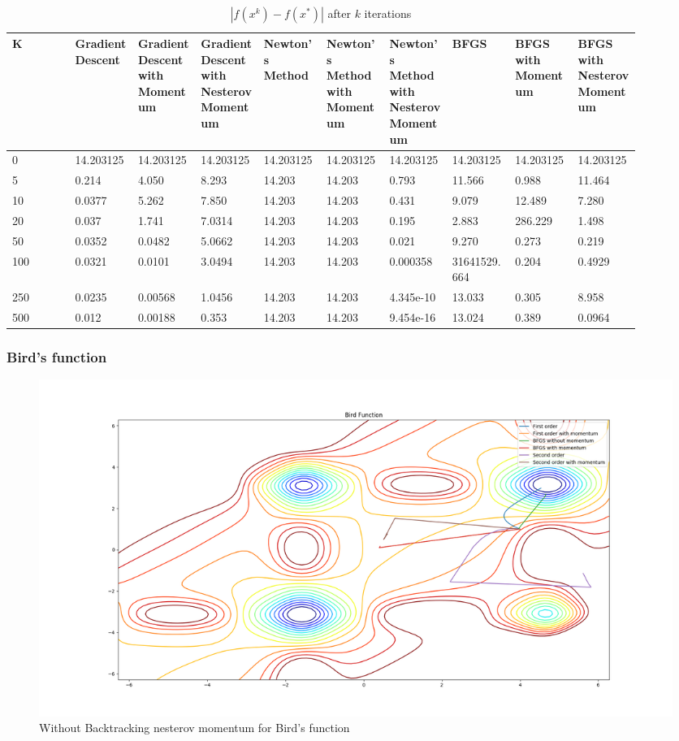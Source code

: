 \documentclass{article}
\begin{document}
\begin{table}[H]
	\centering
	\caption{$ | f(x^k) - f(x^*) | $ after $k$ iterations}
	\label{Beale's function table}
	\begin{tabular}{|l|p{0.1\linewidth}|p{0.1\linewidth}|p{0.1\linewidth}|p{0.1\linewidth}|p{0.1\linewidth}|p{0.1\linewidth}|p{0.1\linewidth}|p{0.1\linewidth}|p{0.1\linewidth}|}
		\hline
		K & Gradient Descent & Gradient Descent with Momentum & Gradient Descent with Nesterov Momentum & Newton's Method & Newton's Method with Momentum & Newton's Method with Nesterov Momentum & BFGS & BFGS with Momentum & BFGS with Nesterov Momentum \\
		\hline
		0 & 14.203125 & 14.203125 & 14.203125 & 14.203125 & 14.203125 & 14.203125 & 14.203125 & 14.203125 & 14.203125 \\
		\hline
		5 & 0.214 & 4.050 & 8.293 & 14.203 & 14.203 & 0.793 & 11.566 & 0.988 & 11.464 \\
		\hline
		10 & 0.0377 & 5.262 & 7.850 & 14.203 & 14.203 & 0.431 & 9.079 & 12.489 & 7.280 \\
		\hline
		20 & 0.037 & 1.741 & 7.0314 & 14.203 & 14.203 & 0.195 & 2.883 & 286.229 & 1.498 \\
		\hline 
		50 & 0.0352 & 0.0482 & 5.0662 & 14.203 & 14.203 & 0.021 & 9.270 & 0.273 & 0.219 \\
		\hline 
		100 & 0.0321 & 0.0101 & 3.0494 & 14.203 & 14.203 & 0.000358 & 31641529.664 & 0.204 & 0.4929 \\
		\hline
		250 & 0.0235 & 0.00568 & 1.0456 & 14.203 & 14.203 & 4.345e-10 & 13.033 & 0.305 & 8.958 \\
		\hline
		500 & 0.012 & 0.00188 & 0.353 & 14.203 & 14.203 & 9.454e-16 & 13.024 & 0.389 & 0.0964 \\
		\hline
	\end{tabular}
\end{table}

\subsubsection{Bird's function}

\begin{figure}[H]
	\includegraphics[width=\linewidth]{../Images/birdnesterov.png}
	\caption{Without Backtracking nesterov momentum for Bird's function}
	\label{fig:Without Backtracking nesterov momentum for Bird's function}
\end{figure}
\end{document}
